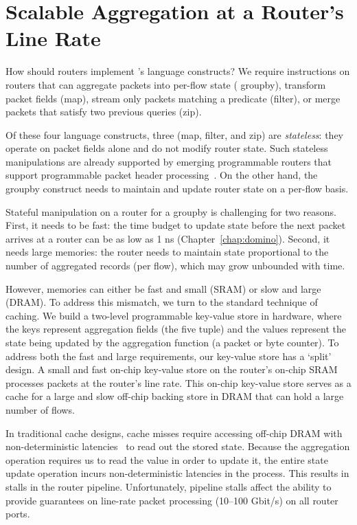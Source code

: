 \section{Scalable Aggregation at a Router's Line Rate}
\label{sec:aggregation}

How should routers implement \TheSystem's language constructs? We require
instructions on routers that can aggregate packets into per-flow state ({\ct
groupby}), transform packet fields ({\ct map}), stream only packets matching a
predicate ({\ct filter}), or merge packets that satisfy two previous queries
({\ct zip}).

Of these four language constructs, three ({\ct map}, {\ct filter}, and {\ct
zip}) are {\em stateless}: they operate on packet fields alone and do not
modify router state. Such stateless manipulations are already supported by
emerging programmable routers that support programmable packet header
processing~\cite{rmt, xpliant, flexpipe, tofino}. On the other hand, the {\ct
groupby} construct needs to maintain and update router state on a per-flow
basis.


Stateful manipulation on a router for a {\ct groupby} is challenging for two
reasons. First, it needs to be fast: the time budget to update state before the
next packet arrives at a router can be as low as 1 ns
(Chapter~\ref{chap:domino}).  Second, it needs large memories: the router needs
to maintain state proportional to the number of aggregated records (\eg per
flow), which may grow unbounded with time. 

However, memories can either be fast and small (SRAM) or slow and large (DRAM).
 To address this mismatch, we turn to the standard technique of
caching. We build a two-level programmable key-value store in hardware, where
the keys represent aggregation fields (\eg the five tuple) and the values
represent the state being updated by the aggregation function (\eg a packet or
byte counter).  To address both the fast and large requirements, our key-value
store has a `split' design.  A small and fast on-chip key-value store on the
router's on-chip SRAM processes packets at the router's line rate. This on-chip
key-value store serves as a cache for a large and slow off-chip backing store
in DRAM that can hold a large number of flows.

 In traditional cache designs, cache misses require accessing off-chip DRAM
with non-deterministic latencies~\cite{unpredictable_cache} to read out the
stored state. Because the aggregation operation requires us to read the value
in order to update it, the entire state update operation incurs
non-deterministic latencies in the process.  This results in stalls in the
router pipeline. Unfortunately, pipeline stalls affect the ability to provide
guarantees on line-rate packet processing (10--100 Gbit/s) on all router ports.

